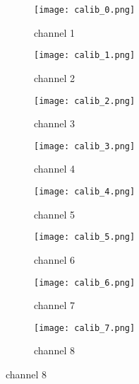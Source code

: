 \documentclass[a4paper, 11pt]{article}
\begin{document}
\begin{figure}
 
\begin{subfigure}{0.5\textwidth}
\texttt{[image: calib\_0.png]} 
\caption{channel 1}
\label{fig:subim1}
\end{subfigure}
\begin{subfigure}{0.5\textwidth}
\texttt{[image: calib\_1.png]}
\caption{channel 2}
\label{fig:subim2}
\end{subfigure}

\begin{subfigure}{0.5\textwidth}
\texttt{[image: calib\_2.png]} 
\caption{channel 3}
\label{fig:subim1}
\end{subfigure}
\begin{subfigure}{0.5\textwidth}
\texttt{[image: calib\_3.png]}
\caption{channel 4}
\label{fig:subim2}
\end{subfigure}

\begin{subfigure}{0.5\textwidth}
\texttt{[image: calib\_4.png]} 
\caption{channel 5}
\label{fig:subim1}
\end{subfigure}
\begin{subfigure}{0.5\textwidth}
\texttt{[image: calib\_5.png]}
\caption{channel 6}
\label{fig:subim2}
\end{subfigure}

\begin{subfigure}{0.5\textwidth}
\texttt{[image: calib\_6.png]} 
\caption{channel 7}
\label{fig:subim1}
\end{subfigure}
\begin{subfigure}{0.5\textwidth}
\texttt{[image: calib\_7.png]}
\caption{channel 8}
\label{fig:subim2}
\end{subfigure}
\end{figure}
\end{document}
